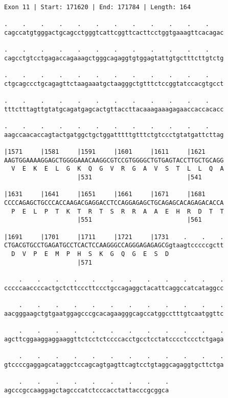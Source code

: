 \documentclass{article}
\begin{document}
\begin{Verbatim}[fontfamily=courier]
Exon 11 | Start: 171620 | End: 171784 | Length: 164

.    .    .    .    .    .    .    .    .    .    .    .    
cagccatgtgggactgcagcctgggtcattcggttcacttcctggtgaaagttcacagac

.    .    .    .    .    .    .    .    .    .    .    .    
cagcctgtcctgagaccagaaagctgggcagaggtgtggagtattgtgctttcttgtctg

.    .    .    .    .    .    .    .    .    .    .    .    
ctgcagccctgcagagttctaagaaatgctaagggctgtttctccggtatccacgtgcct

.    .    .    .    .    .    .    .    .    .    .    .    
tttctttagttgtatgcagatgagcactgttaccttacaaagaaagagaaccaccacacc

.    .    .    .    .    .    .    .    .    .    .    .    
aagccaacaccagtactgatggctgctggatttttgtttctgtccctgtatgattcttag

|1571     |1581     |1591     |1601     |1611     |1621     
AAGTGGAAAAGGAGCTGGGGAAACAAGGCGTCCGTGGGGCTGTGAGTACCTTGCTGCAGG
  V  E  K  E  L  G  K  Q  G  V  R  G  A  V  S  T  L  L  Q  A
                    |531                          |541      

|1631     |1641     |1651     |1661     |1671     |1681     
CCCCAGAGCTGCCCACCAAGACGAGGACCTCCAGGAGAGCTGCAGAGCACAGAGACACCA
  P  E  L  P  T  K  T  R  T  S  R  R  A  A  E  H  R  D  T  T
                    |551                          |561      

|1691     |1701     |1711     |1721     |1731    .    .    .
CTGACGTGCCTGAGATGCCTCACTCCAAGGGCCAGGGAGAGAGCGgtaagtcccccgctt
  D  V  P  E  M  P  H  S  K  G  Q  G  E  S  D               
                    |571                                    

    .    .    .    .    .    .    .    .    .    .    .    .
cccccaaccccactgctcttcccttccctgccagaggctacattcaggccatcataggcc

    .    .    .    .    .    .    .    .    .    .    .    .
aacgggaagctgtgaatggagcccgcacagaagggcagccatggcctttgtcaatggttc

    .    .    .    .    .    .    .    .    .    .    .    .
agcttcggaaggaggaaggttctcctctccccacctgcctcctatcccctccctctgaga

    .    .    .    .    .    .    .    .    .    .    .    .
gtccccgaggagcataggctccagcagtgagttcagtcctgtaggcagaggtgcttctga

    .    .    .    .    .    .    .    .    .
agcccgccaaggagctagcccatctcccacctattacccgcggca
\end{Verbatim}
\end{document}
